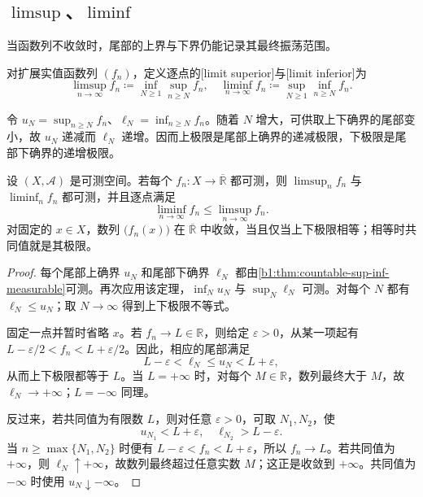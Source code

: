 \subsection{\texorpdfstring{\(\limsup\)}{limsup}、\texorpdfstring{\(\liminf\)}{liminf}}
\label{b1:subsec:040202}

当函数列不收敛时，尾部的上界与下界仍能记录其最终振荡范围。

\begin{definition}
\label{b1:def:function-limsup-liminf}
对扩展实值函数列 \((f_n)\)，定义逐点的[limit superior]与[limit inferior]为
\[
\limsup_{n\to\infty}f_n
\coloneqq\inf_{N\geq1}\sup_{n\geq N}f_n,
\quad
\liminf_{n\to\infty}f_n
\coloneqq\sup_{N\geq1}\inf_{n\geq N}f_n.
\]
\end{definition}

令
\(u_N=\sup_{n\geq N}f_n\)、\(\ell_N=\inf_{n\geq N}f_n\)。随着 \(N\) 增大，可供取上下确界的尾部变小，故 \(u_N\) 递减而 \(\ell_N\) 递增。因而上极限是尾部上确界的递减极限，下极限是尾部下确界的递增极限。

\begin{proposition}
\label{b1:prop:limsup-liminf-measurable}
设 \((X,\mathcal A)\) 是可测空间。若每个 \(f_n:X\rightarrow\overline{\mathbb R}\) 都可测，则
\(\limsup_nf_n\) 与 \(\liminf_nf_n\) 都可测，并且逐点满足
\[
\liminf_{n\to\infty}f_n
\leq
\limsup_{n\to\infty}f_n.
\]
对固定的 \(x\in X\)，数列 \(\bigl(f_n(x)\bigr)\) 在 \(\overline{\mathbb R}\) 中收敛，当且仅当上下极限相等；相等时共同值就是其极限。
\end{proposition}
\begin{proof}
每个尾部上确界 \(u_N\) 和尾部下确界 \(\ell_N\) 都由\cref{b1:thm:countable-sup-inf-measurable}可测。再次应用该定理，\(\inf_Nu_N\) 与 \(\sup_N\ell_N\) 可测。对每个 \(N\) 都有 \(\ell_N\leq u_N\)；取 \(N\to\infty\) 得到上下极限不等式。

固定一点并暂时省略 \(x\)。若 \(f_n\to L\in\mathbb R\)，则给定 \(\varepsilon>0\)，从某一项起有
\(L-\varepsilon/2<f_n<L+\varepsilon/2\)。因此，相应的尾部满足
\[
L-\varepsilon<\ell_N\leq u_N<L+\varepsilon,
\]
从而上下极限都等于 \(L\)。当 \(L=+\infty\) 时，对每个 \(M\in\mathbb R\)，数列最终大于 \(M\)，故 \(\ell_N\to+\infty\)；\(L=-\infty\) 同理。

反过来，若共同值为有限数 \(L\)，则对任意 \(\varepsilon>0\)，可取 \(N_1,N_2\)，使
\[
u_{N_1}<L+\varepsilon,
\quad
\ell_{N_2}>L-\varepsilon.
\]
当 \(n\geq\max\{N_1,N_2\}\) 时便有
\(L-\varepsilon<f_n<L+\varepsilon\)，所以 \(f_n\to L\)。若共同值为 \(+\infty\)，则 \(\ell_N\uparrow+\infty\)，故数列最终超过任意实数 \(M\)；这正是收敛到 \(+\infty\)。共同值为 \(-\infty\) 时使用 \(u_N\downarrow-\infty\)。
\end{proof}

